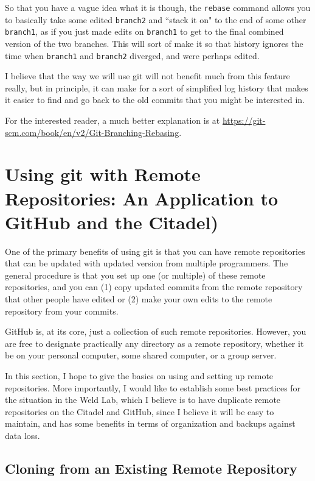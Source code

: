\documentclass[11pt]{article}
\begin{document}
So that you have a vague idea what it is though, the \texttt{rebase} command allows you to basically take some edited \texttt{branch2} and ``stack it on" to the end of some other \texttt{branch1}, as if you just made edits on \texttt{branch1} to get to the final combined version of the two branches.  This will sort of make it so that history ignores the time when \texttt{branch1} and \texttt{branch2} diverged, and were perhaps edited.  

I believe that the way we will use git will not benefit much from this feature really, but in principle, it can make for a sort of simplified log history that makes it easier to find and go back to the old commits that you might be interested in.

For the interested reader, a much better explanation is at \url{https://git-scm.com/book/en/v2/Git-Branching-Rebasing}.

\section{Using git with Remote Repositories: An Application to GitHub and the Citadel)}

One of the primary benefits of using git is that you can have remote repositories that can be updated with updated version from multiple programmers.  The general procedure is that you set up one (or multiple) of these remote repositories, and you can (1) copy updated commits from the remote repository that other people have edited or (2) make your own edits to the remote repository from your commits.

GitHub is, at its core, just a collection of such remote repositories.  However, you are free to designate practically any directory as a remote repository, whether it be on your personal computer, some shared computer, or a group server.

In this section, I hope to give the basics on using and setting up remote repositories.  More importantly, I would like to establish some best practices for the situation in the Weld Lab, which I believe is to have duplicate remote repositories on the Citadel and GitHub, since I believe it will be easy to maintain, and has some benefits in terms of organization and backups against data loss.

\subsection{Cloning from an Existing Remote Repository}
\end{document}
